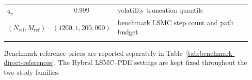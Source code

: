 \begin{table}[htbp]
\begin{threeparttable}
\begin{tabularx}{0.94\textwidth}{@{}l c X@{}}
$q_v$ & 0.999 & volatility truncation quantile \\
$(N_{\mathrm{ref}},M_{\mathrm{ref}})$ & \((1200,1{,}200{,}000)\) & benchmark LSMC step count and path budget \\
\botrule
\end{tabularx}
\begin{tablenotes}[flushleft]
\footnotesize
\item Benchmark reference prices are reported separately in Table~\ref{tab:benchmark-direct-references}. The Hybrid LSMC--PDE settings are kept fixed throughout the two study families.
\end{tablenotes}
\end{threeparttable}
\end{table}
